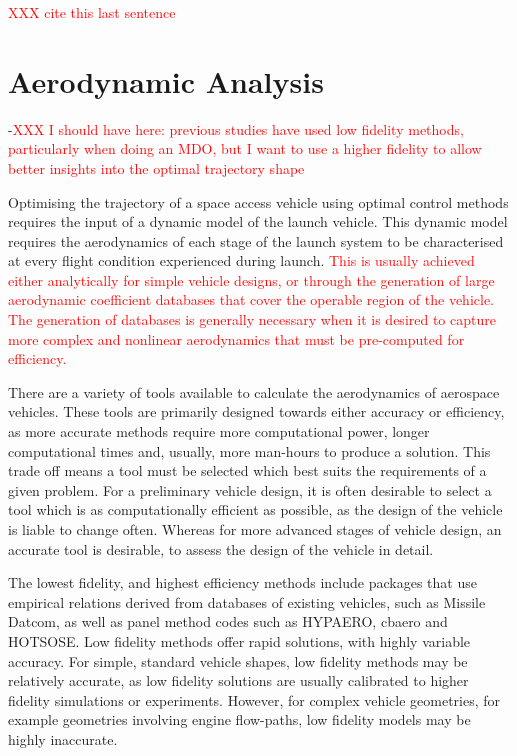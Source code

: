 \textcolor{red}{XXX cite this last sentence}















 







\section{Aerodynamic Analysis}

-\textcolor{red}{XXX I should have here: previous studies have used low fidelity methods, particularly when doing an MDO, but I want to use a higher fidelity to allow better insights into the optimal trajectory shape}

Optimising the trajectory of a space access vehicle using optimal control methods requires the input of a dynamic model of the launch vehicle. 
This dynamic model requires the aerodynamics of each stage of the launch system to be characterised at every flight condition experienced during launch. \textcolor{red}{This is usually achieved either analytically for simple vehicle designs, or through the generation of large aerodynamic coefficient databases that cover the operable region of the vehicle. The generation of databases is generally necessary when it is desired to capture more complex and nonlinear aerodynamics that must be pre-computed for efficiency.}

There are a variety of tools available to calculate the aerodynamics of aerospace vehicles.
 These tools are primarily designed towards either accuracy or efficiency, as more accurate methods require more computational power, longer computational times and, usually, more man-hours to produce a solution. 
This trade off means a tool must be selected which best suits the requirements of a given problem. 
For a preliminary vehicle design, it is often desirable to select a tool which is as computationally efficient as possible, as the design of the vehicle is liable to change often. 
Whereas for more advanced stages of vehicle design, an accurate tool is desirable, to assess the design of the vehicle in detail. 

The lowest fidelity, and highest efficiency methods include packages that use empirical relations derived from databases of existing vehicles, such as Missile Datcom\cite{Rosema2011}, as well as panel method codes such as HYPAERO\cite{Preller2017b}, cbaero\cite{Kinney2004} and HOTSOSE\cite{hotsose}. Low fidelity methods offer rapid solutions, with highly variable accuracy. For simple, standard vehicle shapes, low fidelity methods may be relatively accurate, as low fidelity solutions are usually calibrated to higher fidelity simulations or experiments. However, for complex vehicle geometries, for example geometries involving engine flow-paths, low fidelity models may be highly inaccurate\cite{Krause2011}. 

